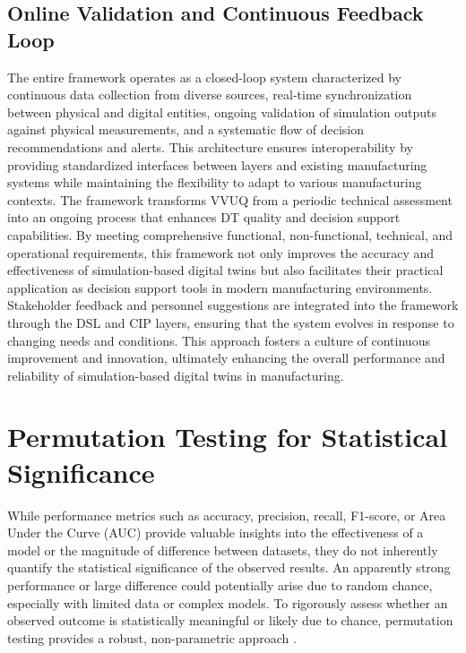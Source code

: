 \subsection{Online Validation and Continuous Feedback Loop}
\label{sec:online-validation}
The entire framework operates as a closed-loop system characterized by continuous data collection from diverse sources, real-time synchronization between physical and digital entities, ongoing validation of simulation outputs against physical measurements, and a systematic flow of decision recommendations and alerts. This architecture ensures interoperability by providing standardized interfaces between layers and existing manufacturing systems while maintaining the flexibility to adapt to various manufacturing contexts. The framework transforms VVUQ from a periodic technical assessment into an ongoing process that enhances DT quality and decision support capabilities. By meeting comprehensive functional, non-functional, technical, and operational requirements, this framework not only improves the accuracy and effectiveness of simulation-based digital twins but also facilitates their practical application as decision support tools in modern manufacturing environments. Stakeholder feedback and personnel suggestions are integrated into the framework through the DSL and CIP layers, ensuring that the system evolves in response to changing needs and conditions. This approach fosters a culture of continuous improvement and innovation, ultimately enhancing the overall performance and reliability of simulation-based digital twins in manufacturing.

\section{Permutation Testing for Statistical Significance}
\label{sec:permtest}

While performance metrics such as accuracy, precision, recall, F1-score, or Area Under the Curve (AUC) provide valuable insights into the effectiveness of a model or the magnitude of difference between datasets, they do not inherently quantify the statistical significance of the observed results. An apparently strong performance or large difference could potentially arise due to random chance, especially with limited data or complex models. To rigorously assess whether an observed outcome is statistically meaningful or likely due to chance, permutation testing provides a robust, non-parametric approach \autocite{welch1990construction}.

